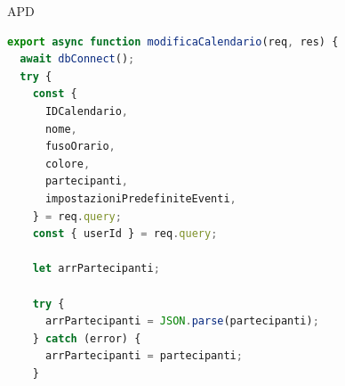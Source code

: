 \begin{listaPersonale} {APD}
\begin{listaPersonale2}[APD]{}

                \begin{lstlisting}[language=JavaScript]
export async function modificaCalendario(req, res) {
  await dbConnect();
  try {
    const {
      IDCalendario,
      nome,
      fusoOrario,
      colore,
      partecipanti,
      impostazioniPredefiniteEventi,
    } = req.query;
    const { userId } = req.query;

    let arrPartecipanti;

    try {
      arrPartecipanti = JSON.parse(partecipanti);
    } catch (error) {
      arrPartecipanti = partecipanti;
    }


\end{lstlisting}
\end{listaPersonale2}
\end{listaPersonale}
